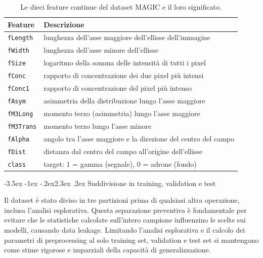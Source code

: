 \documentclass[12pt,a4paper]{article}
\makeatletter
\renewcommand\section{\@startsection{section}{1}{\z@}%
  {-3.5ex \@plus -1ex \@minus -.2ex}{2.3ex \@plus.2ex}%
  {\normalfont\Large\bfseries}}
\makeatother
\begin{document}
\begin{table}[H]\centering\small
	\caption{Le dieci feature continue del dataset MAGIC e il loro
	significato.}\label{tab:feature}
	\begin{tabular}{ll}
		\toprule
		\textbf{Feature} & \textbf{Descrizione} \\
		\midrule
		\texttt{fLength} & lunghezza dell'asse maggiore dell'ellisse dell'immagine \\
		\texttt{fWidth} & lunghezza dell'asse minore dell'ellisse \\
		\texttt{fSize} & logaritmo della somma delle intensità di tutti i pixel \\
		\texttt{fConc} & rapporto di concentrazione dei due pixel più intensi \\
		\texttt{fConc1} & rapporto di concentrazione del pixel più intenso \\
		\texttt{fAsym} & asimmetria della distribuzione lungo l'asse maggiore \\
		\texttt{fM3Long} & momento terzo (asimmetria) lungo l'asse maggiore \\
		\texttt{fM3Trans} & momento terzo lungo l'asse minore \\
		\texttt{fAlpha} & angolo tra l'asse maggiore e la direzione del centro del
		campo \\
		\texttt{fDist} & distanza dal centro del campo all'origine dell'ellisse \\
		\midrule
		\texttt{class} & target: $1$ = gamma (segnale), $0$ = adrone (fondo) \\
		\bottomrule
	\end{tabular}
\end{table}

\section{Suddivisione in training, validation e test}\label{sec:split}

Il dataset è stato diviso in tre partizioni prima di qualsiasi altra operazione,
inclusa l'analisi esplorativa. Questa separazione preventiva è fondamentale per
evitare che le statistiche calcolate sull'intero campione influenzino le scelte
sui modelli, causando data leakage. Limitando l'analisi esplorativa e il calcolo
dei parametri di preprocessing al solo training set, validation e test set si
mantengono come stime rigorose e imparziali della capacità di generalizzazione.
\end{document}
